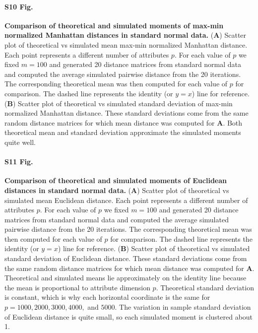 \documentclass[10pt,letterpaper]{article}
\begin{document}
\paragraph*{S10 Fig.}
\label{S10_Fig}
{\bf Comparison of theoretical and simulated moments of max-min normalized Manhattan distances in standard normal data.} (\textbf{A}) Scatter plot of theoretical vs simulated mean max-min normalized Manhattan distance. Each point represents a different number of attributes $p$. For each value of $p$ we fixed $m=100$ and generated 20 distance matrices from standard normal data and computed the average simulated pairwise distance from the 20 iterations. The corresponding theoretical mean was then computed for each value of $p$ for comparison. The dashed line represents the identity (or $y=x$) line for reference. (\textbf{B}) Scatter plot of theoretical vs simulated standard deviation of max-min normalized Manhattan distance. These standard deviations come from the same random distance matrices for which mean distance was computed for \textbf{A}. Both theoretical mean and standard deviation approximate the simulated moments quite well.

\paragraph*{S11 Fig.}
\label{S11_Fig}
{\bf Comparison of theoretical and simulated moments of Euclidean distances in standard normal data.} (\textbf{A}) Scatter plot of theoretical vs simulated mean Euclidean distance. Each point represents a different number of attributes $p$. For each value of $p$ we fixed $m=100$ and generated 20 distance matrices from standard normal data and computed the average simulated pairwise distance from the 20 iterations. The corresponding theoretical mean was then computed for each value of $p$ for comparison. The dashed line represents the identity (or $y=x$) line for reference. (\textbf{B}) Scatter plot of theoretical vs simulated standard deviation of Euclidean distance. These standard deviations come from the same random distance matrices for which mean distance was computed for \textbf{A}. Theoretical and simulated means lie approximately on the identity line because the mean is proportional to attribute dimension $p$. Theoretical standard deviation is constant, which is why each horizontal coordinate is the same for $p=1000,2000,3000,4000,$ and $5000$. The variation in sample standard deviation of Euclidean distance is quite small, so each simulated moment is clustered about 1.
\end{document}
